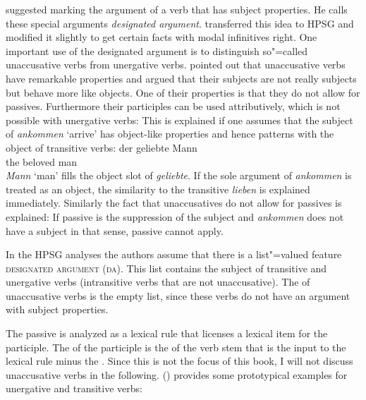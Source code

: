 \citet[]{Haider86} suggested marking the argument of a verb that has subject properties. He calls
these special arguments \emph{designated argument}. \citet{HM94a} transferred this idea to HPSG and
\citet{Mueller2003e} modified it slightly to get certain facts with modal infinitives
right. One important use of the designated argument is to distinguish so"=called
unaccusative verbs from unergative verbs. \citet{Perlmutter78} pointed out that unaccusative verbs
have remarkable properties and argued that their subjects are not really subjects but behave more
like objects. One of their properties is that they do not allow for passives. Furthermore their
participles can be used attributively, which is not possible with unergative verbs:
\eal
{}
\zl
This is explained if one assumes that the subject of \emph{ankommen} `arrive' has object-like
properties and hence patterns with the object of transitive verbs:
\ea
\gll der geliebte Mann\\
     the beloved  man\\
\z
\emph{Mann} `man' fills the object slot of \emph{geliebte}. If the sole argument of \emph{ankommen}
is treated as an object, the similarity to the transitive \emph{lieben} is explained
immediately. Similarly the fact that unaccusatives do not allow for passives is explained: If
passive is the suppression of the subject and \emph{ankommen} does not have a subject in that sense,
passive cannot apply.
\eal
{}
\zl

In the HPSG analyses the authors assume that there is a list"=valued feature \textsc{designated
  argument} (\textsc{da}). This list contains the subject of transitive and unergative verbs
(intransitive verbs that are not unaccusative). The \dav of unaccusative verbs is the empty list,
since these verbs do not have an argument with subject properties.

The passive is analyzed as a lexical rule that licenses a lexical item for the participle. The
\argstl of the participle is the \argstl of the verb stem that is the input to the lexical rule minus
the \dalist. Since this is not the focus of this book, I will not discuss unaccusative verbs in the
following. () provides some prototypical examples for unergative and transitive verbs:

